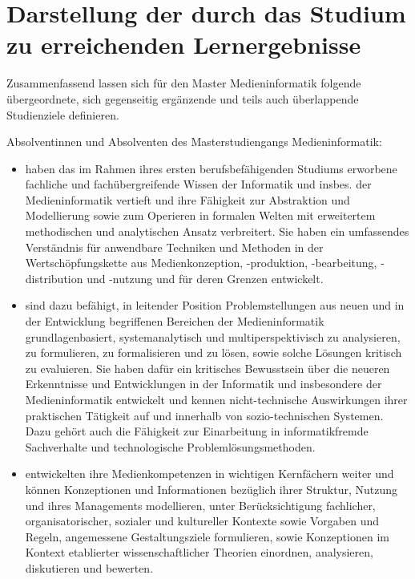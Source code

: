 \section{Darstellung der durch das Studium zu erreichenden
Lernergebnisse}\label{darstellung-der-durch-das-studium-zu-erreichenden-lernergebnisse-1}

Zusammenfassend lassen sich für den Master Medieninformatik folgende
übergeordnete, sich gegenseitig ergänzende und teils auch überlappende
Studienziele definieren.

Absolventinnen und Absolventen des Masterstudiengangs Medieninformatik:

\begin{itemize}
\item
  haben das im Rahmen ihres ersten berufsbefähigenden Studiums erworbene
  fachliche und fachübergreifende Wissen der Informatik und insbes. der
  Medieninformatik vertieft und ihre Fähigkeit zur Abstraktion und
  Modellierung sowie zum Operieren in formalen Welten mit erweitertem
  methodischen und analytischen Ansatz verbreitert. Sie haben ein
  umfassendes Verständnis für anwendbare Techniken und Methoden in der
  Wertschöpfungskette aus Medienkonzeption, -produktion, -bearbeitung,
  -distribution und -nutzung und für deren Grenzen entwickelt.
\item
  sind dazu befähigt, in leitender Position Problemstellungen aus neuen
  und in der Entwicklung begriffenen Bereichen der Medieninformatik
  grundlagenbasiert, systemanalytisch und multiperspektivisch zu
  analysieren, zu formulieren, zu formalisieren und zu lösen, sowie
  solche Lösungen kritisch zu evaluieren. Sie haben dafür ein kritisches
  Bewusstsein über die neueren Erkenntnisse und Entwicklungen in der
  Informatik und insbesondere der Medieninformatik entwickelt und kennen
  nicht-technische Auswirkungen ihrer praktischen Tätigkeit auf und
  innerhalb von sozio-technischen Systemen. Dazu gehört auch die
  Fähigkeit zur Einarbeitung in informatikfremde Sachverhalte und
  technologische Problemlösungsmethoden.
\item
  entwickelten ihre Medienkompetenzen in wichtigen Kernfächern weiter
  und können Konzeptionen und Informationen bezüglich ihrer Struktur,
  Nutzung und ihres Managements modellieren, unter Berücksichtigung
  fachlicher, organisatorischer, sozialer und kultureller Kontexte sowie
  Vorgaben und Regeln, angemessene Gestaltungsziele formulieren, sowie
  Konzeptionen im Kontext etablierter wissenschaftlicher Theorien
  einordnen, analysieren, diskutieren und bewerten.

\end{itemize}
